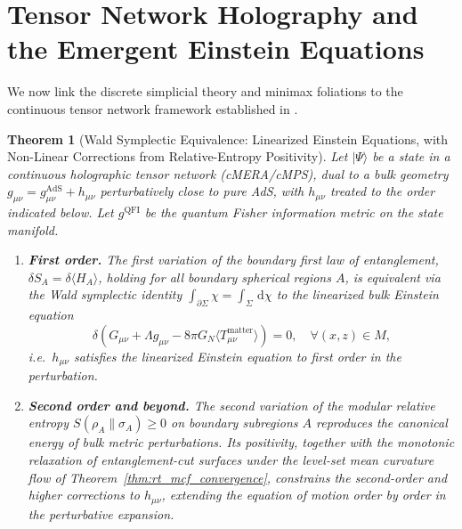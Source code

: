 \documentclass[11pt,a4paper,reqno]{amsart}
\newtheorem{theorem}{Theorem}[section]
\theoremstyle{definition}
\numberwithin{equation}{section}
\newcommand{\dif}{\,\mathrm{d}}
\begin{document}
\section{Tensor Network Holography and the Emergent Einstein Equations}
\label{sec:holographic_emergence}

We now link the discrete simplicial theory and minimax foliations to the continuous tensor network framework established in \cite{silvafilho2026functional, silvafilho2026flows, silvafilho2026spacetime, verstraete2010continuous, swingle2012entanglement}.

\begin{theorem}[Wald Symplectic Equivalence: Linearized Einstein Equations, with Non-Linear Corrections from Relative-Entropy Positivity]
\label{thm:grand_einstein_emergence}
Let $|\Psi\rangle$ be a state in a continuous holographic tensor network (cMERA/cMPS), dual to a bulk geometry $g_{\mu\nu} = g_{\mu\nu}^{\mathrm{AdS}} + h_{\mu\nu}$ perturbatively close to pure AdS, with $h_{\mu\nu}$ treated to the order indicated below. Let $g^{\mathrm{QFI}}$ be the quantum Fisher information metric on the state manifold.
\begin{enumerate}[label=(\roman*)]
    \item \textbf{First order.} The first variation of the boundary first law of entanglement, $\delta S_A = \delta \langle H_A \rangle$, holding for all boundary spherical regions $A$, is equivalent via the Wald symplectic identity $\int_{\partial \Sigma} \chi = \int_\Sigma \dif \chi$ to the \emph{linearized} bulk Einstein equation
    \begin{equation}
        \delta\!\left( G_{\mu\nu} + \Lambda g_{\mu\nu} - 8\pi G_N \langle T_{\mu\nu}^{\mathrm{matter}} \rangle \right) = 0, \quad \forall (x, z) \in M,
    \end{equation}
    i.e.\ $h_{\mu\nu}$ satisfies the linearized Einstein equation to first order in the perturbation.
    \item \textbf{Second order and beyond.} The second variation of the modular relative entropy $S(\rho_A \| \sigma_A) \ge 0$ on boundary subregions $A$ reproduces the canonical energy of bulk metric perturbations. Its positivity, together with the monotonic relaxation of entanglement-cut surfaces under the level-set mean curvature flow of Theorem~\ref{thm:rt_mcf_convergence}, constrains the second-order and higher corrections to $h_{\mu\nu}$, extending the equation of motion order by order in the perturbative expansion.
\end{enumerate}
\end{theorem}
\end{document}
